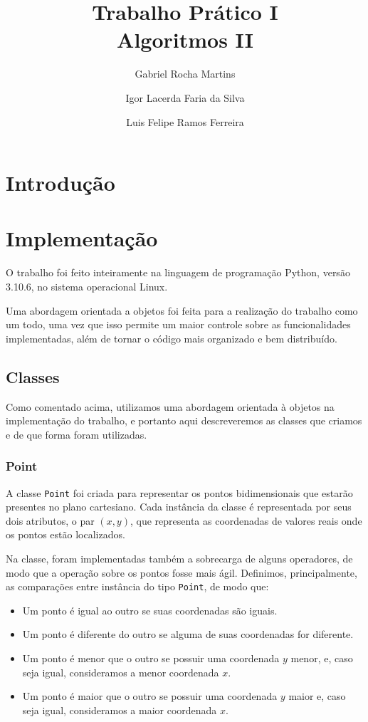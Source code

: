 \documentclass{article}
\author{
    Gabriel Rocha Martins
    \and 
    Igor Lacerda Faria da Silva
    \and 
    Luis Felipe Ramos Ferreira
}
\title{Trabalho Prático I \\
Algoritmos II}
\date{%
}
\begin{document}
\maketitle

\section{Introdução}

\section{Implementação}
O trabalho foi feito inteiramente na linguagem de programação Python, versão 3.10.6, no sistema operacional Linux.

Uma abordagem orientada a objetos foi feita para a realização do trabalho como um todo, uma vez que isso permite um maior controle sobre as funcionalidades implementadas, além de tornar o código mais organizado e bem distribuído.

\subsection{Classes}
Como comentado acima, utilizamos uma abordagem orientada à objetos na implementação do trabalho, e portanto aqui descreveremos as classes que criamos e de que forma foram utilizadas.

\subsubsection{Point}

A classe \texttt{Point} foi criada para representar os pontos bidimensionais que estarão presentes no plano cartesiano. Cada instância da classe é representada por seus dois atributos, o par \( (x,y) \), que representa as coordenadas de valores reais onde os pontos estão localizados.

Na classe, foram implementadas também a sobrecarga de alguns operadores, de modo que a operação sobre os pontos fosse mais ágil. Definimos, principalmente, as comparações entre instância do tipo \texttt{Point}, de modo que:

\begin{itemize}
	\item Um ponto é igual ao outro se suas coordenadas são iguais.
	\item Um ponto é diferente do outro se alguma de suas coordenadas for diferente.
	\item Um ponto é menor que o outro se possuir uma coordenada \( y \) menor, e, caso seja igual, consideramos a menor coordenada \( x \).
	\item Um ponto é maior que o outro se possuir uma coordenada \( y \) maior e, caso seja igual, consideramos a maior coordenada \( x \).
\end{itemize}
\end{document}

